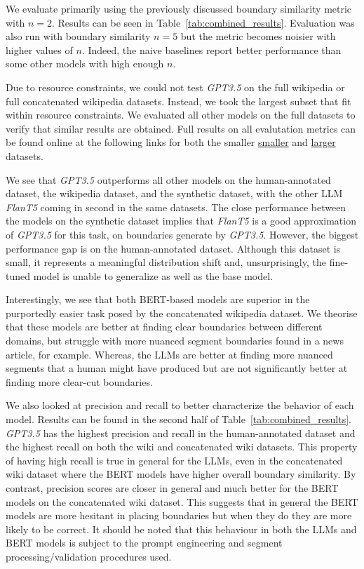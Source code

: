 We evaluate primarily using the previously discussed boundary similarity metric with $n=2$. Results can be seen in Table~\ref{tab:combined_results}. Evaluation was also run with boundary similarity $n=5$ but the metric becomes noisier with higher values of $n$. Indeed, the naive baselines report better performance than some other models with high enough $n$. 

Due to resource constraints, we could not test \emph{GPT3.5} on the full wikipedia or full concatenated wikipedia datasets. Instead, we took the largest subset that fit within resource constraints. We evaluated all other models on the full datasets to verify that similar results are obtained. Full results on all evalutation metrics can be found online at the following links for both the smaller \href{https://docs.google.com/spreadsheets/d/15CJhNuioTS9L13tXsGfaG54igEF1HB6Os_mnR0k4P-I/edit?usp=sharing}{smaller} and \href{https://docs.google.com/spreadsheets/d/1UorM9wHrSOVURJ5djldZ6y3kCjNMNcQSFEBOALo-HgI/edit?usp=sharing}{larger} datasets.

We see that \emph{GPT3.5} outperforms all other models on the human-annotated dataset, the wikipedia dataset, and the synthetic dataset, with the other LLM \emph{FlanT5} coming in second in the same datasets. The close performance between the models on the synthetic dataset implies that \emph{FlanT5} is a good approximation of \emph{GPT3.5} for this task, on boundaries generate by \emph{GPT3.5}. However, the biggest performance gap is on the human-annotated dataset. Although this dataset is small, it represents a meaningful distribution shift and, unsurprisingly, the fine-tuned model is unable to generalize as well as the base model.

Interestingly, we see that both BERT-based models are superior in the purportedly easier task posed by the concatenated wikipedia dataset. We theorise that these models are better at finding clear boundaries between different domains, but struggle with more nuanced segment boundaries found in a news article, for example. Whereas, the LLMs are better at finding more nuanced segments that a human might have produced but are not significantly better at finding more clear-cut boundaries.



We also looked at precision and recall to better characterize the behavior of each model. Results can be found in the second half of Table~\ref{tab:combined_results}. \emph{GPT3.5} has the highest precision and recall in the human-annotated dataset and the highest recall on both the wiki and concatenated wiki datasets. This property of having high recall is true in general for the LLMs, even in the concatenated wiki dataset where the BERT models have higher overall boundary similarity. By contrast, precision scores are closer in general and much better for the BERT models on the concatenated wiki dataset. This suggests that in general the BERT models are more hesitant in placing boundaries but when they do they are more likely to be correct. It should be noted that this behaviour in both the LLMs and BERT models is subject to the prompt engineering and segment processing/validation procedures used.

